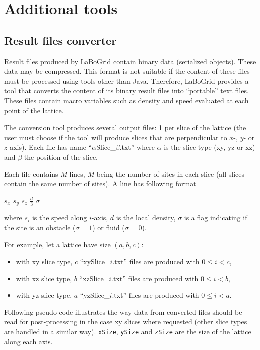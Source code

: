 \chapter{Additional tools}
\label{sec_add}

\section{Result files converter}
\label{sec_add_conv}

Result files produced by LaBoGrid contain binary data (serialized objects).
These data may be compressed. This format is not suitable if the content of
these files must be processed using tools other than Java. Therefore, LaBoGrid
provides a tool that converts the content of its binary result files
into ``portable'' text files. These files contain macro variables such as
density and speed evaluated at each point of the lattice.

The conversion tool produces several output files: 1 per slice of the lattice
(the user must choose if the tool will produce slices that are perpendicular to
$x$-, $y$- or $z$-axis). Each file has name ``$\alpha$Slice\_$\beta$.txt'' where
$\alpha$ is the slice type (xy, yz or xz) and $\beta$ the position of the slice.

Each file contains $M$ lines, $M$ being the number of sites in each slice (all
slices contain the same number of sites). A line has following format
%
\begin{center}
$s_x$ $s_y$ $s_z$ $\frac{d}{3}$ $\sigma$
\end{center}
%
where $s_i$ is the speed along $i$-axis, $d$ is the local density, $\sigma$ is a
flag indicating if the site is an obstacle ($\sigma=1$) or fluid ($\sigma=0$).

For example, let a lattice have size $(a, b, c)$:
\begin{itemize}
	\item with xy slice type, $c$ ``xySlice\_$i$.txt'' files are produced with $0
	\leq i < c$,
	\item with xz slice type, $b$ ``xzSlice\_$i$.txt'' files are produced with $0
	\leq i < b$,
	\item with yz slice type, $a$ ``yzSlice\_$i$.txt'' files are produced with $0
	\leq i < a$.
\end{itemize}

Following pseudo-code illustrates the way data from converted files should be
read for post-processing in the case xy slices where requested (other slice
types are handled in a similar way). \texttt{xSize}, \texttt{ySize} and
\texttt{zSize} are the size of the lattice along each axis.

